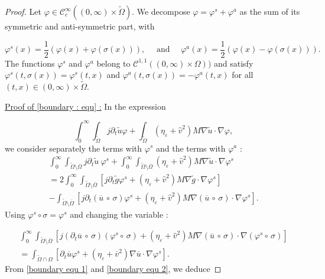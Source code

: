 \documentclass[10pt,a4paper]{amsart}
\begin{document}
\begin{proof}
Let $\varphi \in \mathcal{C}_c^\infty ((0,\infty)\times \widetilde{\Omega})$. We decompose $\varphi = \varphi ^s +\varphi^a$ as the sum of its symmetric and anti-symmetric part, with 

\[\varphi^s(x) = \frac{1}{2}( \varphi(x) + \varphi (\sigma (x))), \quad \text{ and } \quad \varphi^a(x) = \frac{1}{2}( \varphi(x) - \varphi (\sigma (x))).\]
The functions $\varphi^s$ and $\varphi ^a$ belong to $\mathcal{C}^{1,1}((0,\infty)\times \Omega))$ and satisfy $\varphi ^s(t,\sigma(x)) = \varphi ^s(t,x)$ and $\varphi ^a (t, \sigma(x)) = - \varphi ^a(t,x)$ for all $(t,x) \in (0,\infty) \times \widetilde{\Omega}$. 

\medskip

\underline{Proof of \eqref{boundary : equ} :} In the expression   

\[\int_0^\infty \int_{\widetilde{\Omega}} j \partial_t \widetilde{u} \varphi + \int_{\widetilde{\Omega}} (\eta_\varepsilon + \hat{v}^2 )M \nabla \widetilde{u} \cdot \nabla \varphi,\]
we consider separately the terms with $\varphi^s$ and the terms with $\varphi^a$ : 
\begin{multline}\label{boundary equ 1}
\int_0^\infty\int_{\widetilde{\Omega}\setminus \overline{\Omega}} j \partial_t \widetilde{u}\: \varphi^s  + \int_0^\infty \int_{\widetilde{\Omega}\setminus \overline{\Omega}} (\eta_\varepsilon + \hat{v}^2) M\nabla \widetilde{u} \cdot \nabla \varphi^s \\
= 2 \int_0^\infty \int_{\widetilde{\Omega}\setminus \overline{\Omega}} \left[j\partial_t \widetilde{g} \varphi^s +(\eta_\varepsilon + \hat{v}^2)M\nabla \widetilde{g} \cdot \nabla \varphi ^s\right]\\
- \int_{\widetilde{\Omega}\setminus \overline{\Omega}} \left[j\partial_t (\overline{u}\, \circ \, \sigma) \varphi^s + (\eta_\varepsilon + \hat{v}^2)M\nabla (\overline{u}\, \circ\, \sigma) \cdot \nabla \varphi ^s\right].
\end{multline}
Using $\varphi^s \circ \sigma = \varphi^s$ and changing the variable : 

\begin{multline}\label{boundary equ 2}
\int_0^\infty\int_{\widetilde{\Omega}\setminus \overline{\Omega}}\left[ j(\partial_t\overline{u}\, \circ \,\sigma)(\varphi^s \circ\, \sigma) + (\eta_\varepsilon + \hat{v}^2)M\nabla (\overline{u}\, \circ \,\sigma) \cdot \nabla (\varphi ^s \circ \,\sigma)\right]\\
= \int_{\widetilde{\Omega}\cap \Omega} \left[\partial_t \overline{u} \varphi^s + (\eta_\varepsilon + \overline{v}^2) \nabla \overline{u} \cdot \nabla \varphi^s\right].
\end{multline}
From \eqref{boundary equ 1} and \eqref{boundary equ 2}, we deduce 


\end{proof}
\end{document}
